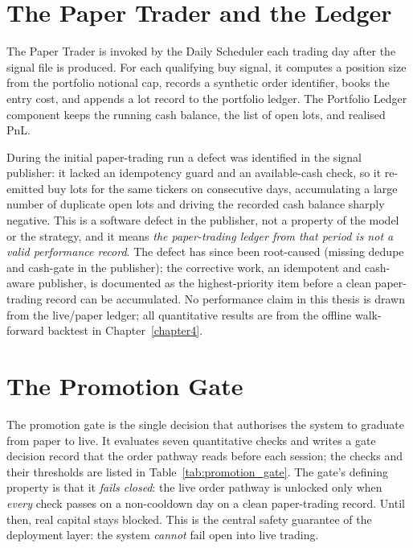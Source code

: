 \section{The Paper Trader and the Ledger}

The Paper Trader is invoked by the Daily Scheduler each trading day after the signal file is produced. For each qualifying buy signal, it computes a position size from the portfolio notional cap, records a synthetic order identifier, books the entry cost, and appends a lot record to the portfolio ledger. The Portfolio Ledger component keeps the running cash balance, the list of open lots, and realised PnL.

During the initial paper-trading run a defect was identified in the signal publisher: it lacked an idempotency guard and an available-cash check, so it re-emitted buy lots for the same tickers on consecutive days, accumulating a large number of duplicate open lots and driving the recorded cash balance sharply negative. This is a software defect in the publisher, not a property of the model or the strategy, and it means \emph{the paper-trading ledger from that period is not a valid performance record}. The defect has since been root-caused (missing dedupe and cash-gate in the publisher); the corrective work, an idempotent and cash-aware publisher, is documented as the highest-priority item before a clean paper-trading record can be accumulated. No performance claim in this thesis is drawn from the live/paper ledger; all quantitative results are from the offline walk-forward backtest in Chapter~\ref{chapter4}.

\section{The Promotion Gate}

The promotion gate is the single decision that authorises the system to graduate from paper to live. It evaluates seven quantitative checks and writes a gate decision record that the order pathway reads before each session; the checks and their thresholds are listed in Table~\ref{tab:promotion_gate}. The gate's defining property is that it \emph{fails closed}: the live order pathway is unlocked only when \emph{every} check passes on a non-cooldown day on a clean paper-trading record. Until then, real capital stays blocked. This is the central safety guarantee of the deployment layer: the system \emph{cannot} fail open into live trading.

